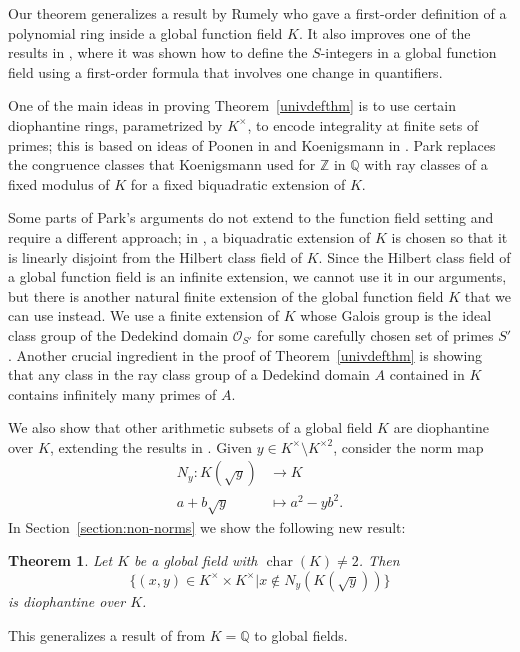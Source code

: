 \documentclass[12pt,reqno]{amsart}
\newcommand{\OO}{\mathcal{O}}
\newcommand{\QQ}{\mathbb{Q}}
\newcommand{\ZZ}{\mathbb{Z}}
\DeclareMathOperator{\ch}{char}
\newtheorem{thm}{Theorem}[section]
\theoremstyle{definition}
\begin{document}
Our theorem generalizes a result by Rumely \cite{Rum80} who gave a
first-order definition of a polynomial ring inside a global function
field $K$. It also improves one of the results in \cite{Shl14}, where it was
shown how to define the $S$-integers in a global function
field using a first-order formula that involves one change in quantifiers.


One of the main ideas in proving Theorem~\ref{univdefthm} is to use certain
diophantine rings, parame\-trized by $K^{\times}$, to encode integrality
at finite sets of primes; this is based on ideas of Poonen in
\cite{Poo09} and Koenigsmann in \cite{Koe13}. Park replaces the
congruence classes that Koenigsmann used for
$\ZZ$ in $\QQ$ with ray classes of a fixed modulus of $K$ for a fixed
biquadratic extension of $K$. 


Some parts of Park's arguments do not extend to the function field
setting and require a different approach; in \cite{Park}, a
biquadratic extension of $K$ is chosen so that it is linearly disjoint
from the Hilbert class field of $K$.  Since the Hilbert class field of
a global function field is an infinite extension, we cannot use it in
our arguments, but there is another natural finite extension of the
global function field $K$ that we can use instead. We use a finite
extension of $K$ whose Galois group is the ideal class group of the
Dedekind domain $\OO_{S'}$ for some carefully chosen set of primes
$S'$.  Another crucial ingredient in the proof of
Theorem~\ref{univdefthm} is showing that any class in the ray class
group of a Dedekind domain $A$ contained in $K$ contains infinitely
many primes of $A$.


We also show that other arithmetic subsets of a global field $K$ are
diophantine over $K$, extending the results in
\cite{Koe13}. %
Given $y\in K^{\times}\setminus K^{\times2}$, consider the
norm map
 \begin{align*}
 N_y: K(\sqrt{y})&\to K \\ 
 a+b\sqrt{y} &\mapsto a^2-yb^2.
 \end{align*}
In Section~\ref{section:non-norms} we show the following new result:
\begin{thm}\label{nonnorm}
Let $K$ be a global field with $\ch(K)\not=2$. Then
\[
\{(x,y)\in K^{\times}\times K^{\times} | x\not\in N_y(K(\sqrt{y}))\}
\]
is diophantine over  $K$. 
\end{thm}
This generalizes a result of \cite{Koe13} from $K=\QQ$ to global
fields. 
\end{document}
